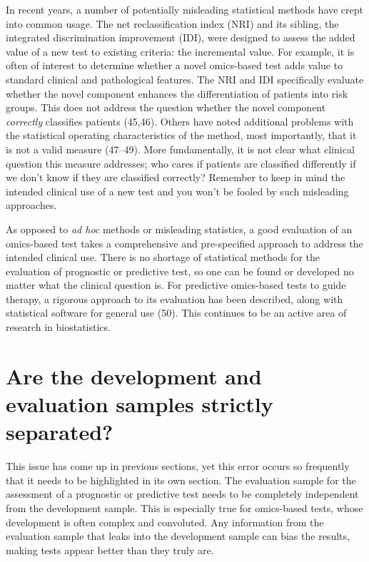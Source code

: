 \documentclass[11pt]{article}
\begin{document}
In recent years, a number of potentially misleading statistical methods
have crept into common usage. The net reclassification index (NRI) and
its sibling, the integrated discrimination improvement (IDI), were
designed to assess the added value of a new test to existing criteria:
the incremental value. For example, it is often of interest to determine
whether a novel omics-based test adds value to standard clinical and
pathological features. The NRI and IDI specifically evaluate whether the
novel component enhances the differentiation of patients into risk
groups. This does not address the question whether the novel component
\emph{correctly} classifies patients (45,46). Others have noted
additional problems with the statistical operating characteristics of
the method, most importantly, that it is not a valid measure (47--49).
More fundamentally, it is not clear what clinical question this measure
addresses; who cares if patients are classified differently if we don't
know if they are classified correctly? Remember to keep in mind the
intended clinical use of a new test and you won't be fooled by such
misleading approaches.

As opposed to \emph{ad hoc} methods or misleading statistics, a good
evaluation of an omics-based test takes a comprehensive and
pre-specified approach to address the intended clinical use. There is no
shortage of statistical methods for the evaluation of prognostic or
predictive test, so one can be found or developed no matter what the
clinical question is. For predictive omics-based tests to guide therapy,
a rigorous approach to its evaluation has been described, along with
statistical software for general use (50). This continues to be an
active area of research in biostatistics.

\section{Are the development and evaluation samples strictly
separated?}\label{are-the-development-and-evaluation-samples-strictly-separated}

This issue has come up in previous sections, yet this error occurs so
frequently that it needs to be highlighted in its own section. The
evaluation sample for the assessment of a prognostic or predictive test
needs to be completely independent from the development sample. This is
especially true for omics-based tests, whose development is often
complex and convoluted. Any information from the evaluation sample that
leaks into the development sample can bias the results, making tests
appear better than they truly are.
\end{document}
